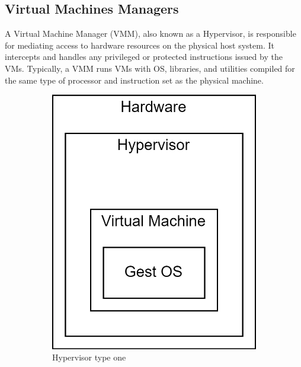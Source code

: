 \subsection{Virtual Machines Managers}
A Virtual Machine Manager (VMM), also known as a Hypervisor, is responsible for mediating access to hardware resources on the physical host system.
It intercepts and handles any privileged or protected instructions issued by the VMs.
Typically, a VMM runs VMs with OS, libraries, and utilities compiled for the same type of processor and instruction set as the physical machine.

\begin{figure}[H]
    \centering
    \begin{subfigure}{0.4\textwidth}
        \centering
        \includegraphics[width=0.75\linewidth]{images/hyp1.png} 
        \caption{Hypervisor type one}
    \end{subfigure}
    \begin{subfigure}{0.4\textwidth}
        \centering

\end{subfigure}
\end{figure}
